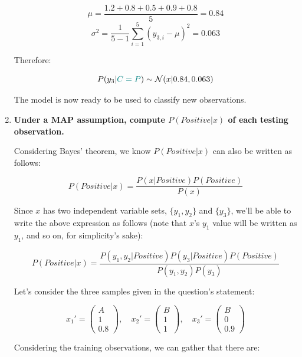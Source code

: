 \documentclass[12pt]{article}
\begin{document}
\begin{enumerate}[leftmargin=\labelsep]
\begin{multicols}{2}
    $$
    \mu = \frac{1.2 + 0.8 + 0.5 + 0.9 + 0.8}{5} = 0.84
    $$
    $$
    \sigma^2 = \frac{1}{5 - 1} \sum_{i = 1}^5 (y_{3, i} - \mu)^2 = 0.063
    $$

    Therefore:

    \vspace{-0.6cm}

    $$
    P(y_3 | \textcolor{teal}{C = P}) \sim \mathcal{N}(x | 0.84, 0.063)
    $$

  \end{multicols}

  The model is now ready to be used to classify new observations.

  \pagebreak

  \item \textbf{Under a MAP assumption, compute $P(Positive | x)$ of each testing observation.}

  Considering Bayes' theorem, we know $P(Positive | x)$ can also be written as follows:

  $$
  P(Positive | x) = \frac{P(x| Positive) P(Positive)}{P(x)}
  $$

  Since $x$ has two independent variable sets, $\{y_1, y_2\}$ and $\{y_3\}$, we'll be
  able to write the above expression as follows (note that $x$'s $y_1$ value will
  be written as $y_1$, and so on, for simplicity's sake):

  $$
  P(Positive | x) = \frac{P(y_1, y_2| Positive) P(y_3| Positive) P(Positive)}{P(y_1, y_2) P(y_3)}
  $$

  Let's consider the three samples given in the question's statement:

  $$
    x_1' = \begin{pmatrix}
      A \\
      1 \\
      0.8
    \end{pmatrix}, \quad
    x_2' = \begin{pmatrix}
      B \\
      1 \\
      1
    \end{pmatrix}, \quad
    x_3' = \begin{pmatrix}
      B \\
      0 \\
      0.9
    \end{pmatrix}
  $$

  Considering the training observations, we can gather that there are:

  \begin{multicols}{3}
    \setlength{\columnseprule}{1pt}
    \def\columnseprulecolor{\color{black}}
    \centering


\end{multicols}
\end{enumerate}
\end{document}
